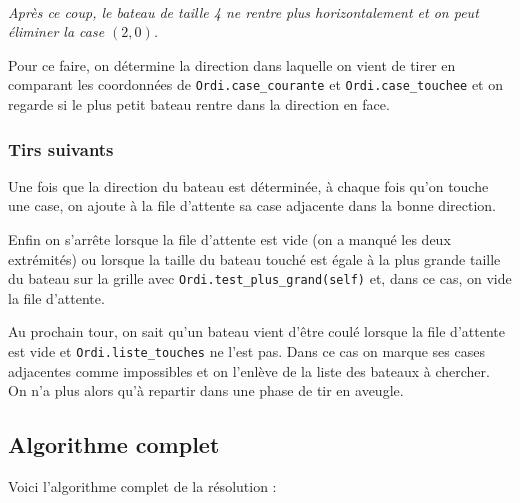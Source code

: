 \begin{itemize}
\begin{center}
\\
\textit{Après ce coup, le bateau de taille 4 ne rentre plus horizontalement et on peut éliminer la case $(2,0)$.}
\end{center}
Pour ce faire, on détermine la direction dans laquelle on vient de tirer en comparant les coordonnées de \texttt{Ordi.case\_courante} et \texttt{Ordi.case\_touchee} et on regarde si le plus petit bateau rentre dans la direction en face.

\end{itemize}   

\subsubsection{Tirs suivants}
Une fois que la direction du bateau est déterminée, à chaque fois qu'on touche une case, on ajoute à la file d'attente sa case adjacente dans la bonne direction.

Enfin on s'arrête lorsque la file d'attente est vide (on a manqué les deux extrémités) ou lorsque la taille du bateau touché est égale à la plus grande taille du bateau sur la grille avec \texttt{Ordi.test\_plus\_grand(self)} et, dans ce cas, on vide la file d'attente. 

Au prochain tour, on sait qu'un bateau vient d'être coulé lorsque la file d'attente est vide et \texttt{Ordi.liste\_touches} ne l'est pas. Dans ce cas on marque ses cases adjacentes comme impossibles et on l'enlève de la liste des bateaux à chercher. On n'a plus alors qu'à repartir dans une phase de tir en aveugle.
\newpage
\subsection{Algorithme complet}
Voici l'algorithme complet de la résolution :

